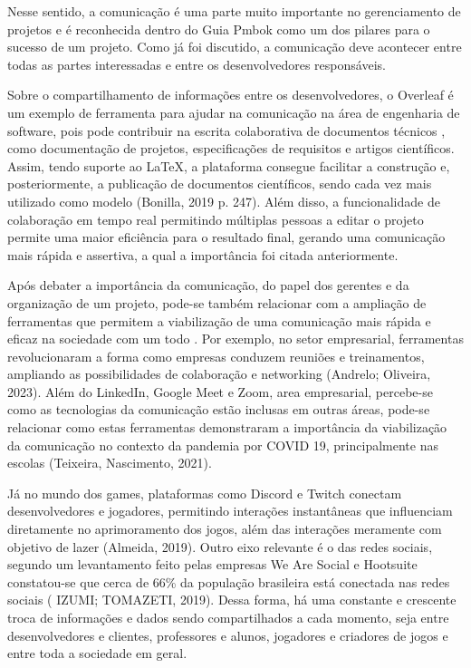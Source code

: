 \documentclass[12pt,oneside,a4paper,article]{abntex2}
\begin{document}
Nesse sentido, a comunicação é uma parte muito importante no gerenciamento de projetos e é reconhecida dentro do Guia Pmbok como um dos pilares para o sucesso de um projeto. Como já foi discutido, a comunicação deve acontecer entre todas as partes interessadas e entre os desenvolvedores responsáveis.

Sobre o compartilhamento de informações entre os desenvolvedores, o Overleaf é um exemplo de ferramenta para ajudar na comunicação na área de engenharia de software, pois pode contribuir na escrita colaborativa de documentos técnicos , como documentação de projetos, especificações de requisitos e artigos científicos. Assim, tendo suporte ao LaTeX, a plataforma consegue facilitar a construção e, posteriormente, a publicação de documentos científicos, sendo cada vez mais utilizado como modelo (Bonilla, 2019 p. 247). Além disso, a funcionalidade de colaboração em tempo real permitindo múltiplas pessoas a editar o projeto permite uma maior eficiência para o resultado final, gerando uma comunicação mais rápida e assertiva, a qual a importância foi citada anteriormente.

Após debater a importância da comunicação, do papel dos gerentes e da organização de um projeto, pode-se também relacionar com a ampliação de ferramentas que permitem a viabilização de uma comunicação mais rápida e eficaz na sociedade com um todo . Por exemplo, no setor empresarial, ferramentas revolucionaram a forma como empresas conduzem reuniões e treinamentos, ampliando as possibilidades de colaboração e networking (Andrelo; Oliveira, 2023). Além do LinkedIn, Google Meet e Zoom, area empresarial, percebe-se como as tecnologias da comunicação estão inclusas em outras áreas, pode-se relacionar como estas ferramentas demonstraram a importância da viabilização da comunicação no contexto da pandemia por COVID 19, principalmente nas escolas (Teixeira, Nascimento, 2021). 

Já no mundo dos games, plataformas como Discord e Twitch conectam desenvolvedores e jogadores, permitindo interações instantâneas que influenciam diretamente no aprimoramento dos jogos, além das interações meramente com objetivo de lazer (Almeida, 2019).  Outro eixo relevante é o das redes sociais, segundo um levantamento feito pelas empresas We Are Social e Hootsuite constatou-se que cerca de 66\% da população brasileira está conectada nas redes sociais ( IZUMI; TOMAZETI, 2019).  Dessa forma, há uma constante e crescente troca de informações e dados sendo compartilhados a cada momento, seja entre desenvolvedores e clientes, professores e alunos, jogadores e criadores de jogos e entre toda a sociedade em geral. 
\end{document}
